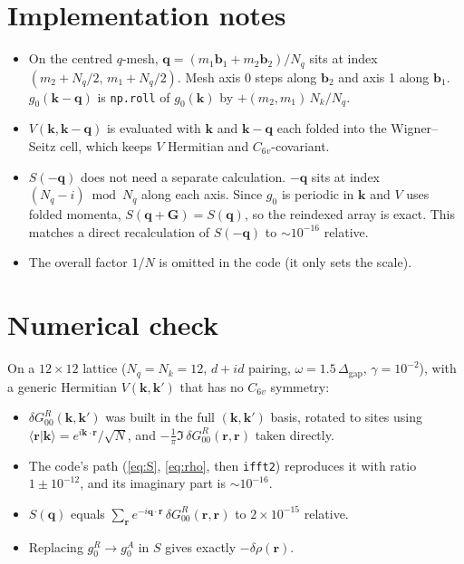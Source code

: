 \documentclass[11pt]{article}
\newcommand{\bk}{\mathbf{k}}
\newcommand{\bq}{\mathbf{q}}
\newcommand{\br}{\mathbf{r}}
\newcommand{\GR}{G^{R}}
\begin{document}
\section{Implementation notes}

\begin{itemize}
  \item On the centred $q$-mesh, $\bq = (m_1\mathbf{b}_1 + m_2\mathbf{b}_2)/N_q$ sits at index $(m_2 + N_q/2,\, m_1 + N_q/2)$. Mesh axis 0 steps along $\mathbf{b}_2$ and axis 1 along $\mathbf{b}_1$. $g_0(\bk-\bq)$ is \texttt{np.roll} of $g_0(\bk)$ by $+(m_2, m_1)\,N_k/N_q$.
  \item $V(\bk,\bk-\bq)$ is evaluated with $\bk$ and $\bk-\bq$ each folded into the Wigner--Seitz cell, which keeps $V$ Hermitian and $C_{6v}$-covariant.
  \item $S(-\bq)$ does not need a separate calculation. $-\bq$ sits at index $(N_q - i) \bmod N_q$ along each axis. Since $g_0$ is periodic in $\bk$ and $V$ uses folded momenta, $S(\bq + \mathbf{G}) = S(\bq)$, so the reindexed array is exact. This matches a direct recalculation of $S(-\bq)$ to $\sim 10^{-16}$ relative.
  \item The overall factor $1/N$ is omitted in the code (it only sets the scale).
\end{itemize}

\section{Numerical check}

On a $12\times12$ lattice ($N_q = N_k = 12$, $d+id$ pairing, $\omega = 1.5\,\Delta_{\mathrm{gap}}$, $\gamma = 10^{-2}$), with a generic Hermitian $V(\bk,\bk')$ that has no $C_{6v}$ symmetry:
\begin{itemize}
  \item $\delta\GR_{00}(\bk,\bk')$ was built in the full $(\bk,\bk')$ basis, rotated to sites using $\langle\br|\bk\rangle = e^{i\bk\cdot\br}/\sqrt{N}$, and $-\frac{1}{\pi}\Im\,\delta\GR_{00}(\br,\br)$ taken directly.
  \item The code's path (\eqref{eq:S}, \eqref{eq:rho}, then \texttt{ifft2}) reproduces it with ratio $1 \pm 10^{-12}$, and its imaginary part is $\sim 10^{-16}$.
  \item $S(\bq)$ equals $\sum_{\br} e^{-i\bq\cdot\br}\,\delta\GR_{00}(\br,\br)$ to $2\times10^{-15}$ relative.
  \item Replacing $g^R_0 \to g^A_0$ in $S$ gives exactly $-\delta\rho(\br)$.
\end{itemize}
\end{document}
